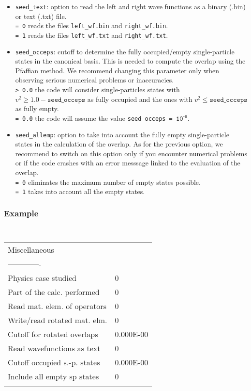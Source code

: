 \documentclass[a4paper,11pt]{article}
\newcommand{\ttt}[1]{\texttt{#1}}
\begin{document}
\begin{itemize}
 \item \ttt{seed\_text}: option to read the left and right wave functions as a binary (.bin) or text (.txt) file. \\[0.05cm]
  \ttt{= 0\:} reads the files \ttt{left\_wf.bin} and \ttt{right\_wf.bin}. \\[0.05cm]
  \ttt{= 1\:} reads the files \ttt{left\_wf.txt} and \ttt{right\_wf.txt}. 
 \item \ttt{seed\_occeps}: cutoff to determine the fully occupied/empty single-particle states in the canonical basis. 
  This is needed to compute the overlap using the Pfaffian method. We recommend changing this parameter only when observing
  serious numerical problems or inaccuracies. \\[0.05cm]
  \ttt{> 0.0\:} the code will consider single-particles states with $v^2 \ge 1.0 - \ttt{seed\_occeps}$ as fully occupied and 
  the ones with $v^2 \le \ttt{seed\_occeps}$ as fully empty. \\[0.05cm]
  \ttt{= 0.0\:} the code will assume the value \ttt{seed\_occeps = ${\ttt{10}}^{\ttt{-8}}$}. 
 \item \ttt{seed\_allemp}: option to take into account the fully empty single-particle states in the calculation of the overlap. As for the previous option, we recommend to switch on this 
  option only if you encounter numerical problems or if the code crashes with an error messsage linked to the evaluation of the overlap. \\[0.05cm]
  \ttt{= 0\:} eliminates the maximum number of empty states possible. \\[0.05cm]
  \ttt{= 1\:} takes into account all the empty states.

\end{itemize}

\subsubsection*{Example}
\begin{center}
\tt
\begin{tabular}{|ll|}
\hline
Miscellaneous                 &          \\
-------------                 &          \\
Physics case studied          &0         \\
Part of the calc. performed   &0         \\
Read mat. elem. of operators  &0         \\
Write/read rotated mat. elm.  &0         \\
Cutoff for rotated overlaps   &0.000E-00 \\
Read wavefunctions as text    &0         \\
Cutoff occupied s.-p. states  &0.000E-00 \\
Include all empty sp states   &0         \\
                              &          \\
\hline
\end{tabular}
\end{center}
\end{document}
